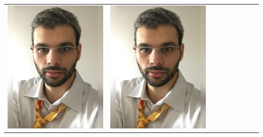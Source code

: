 \documentclass[landscape,a0paper,fontscale=0.292]{baposter}
\begin{document}
\begin{poster}
{\begin{center}
\begin{tabularx}{\linewidth}{X X X X X X X X X}

\includegraphics[width=\linewidth]{censi.jpg}&
\includegraphics[width=\linewidth]{censi.jpg}&

\end{tabularx}
\end{center}}
\end{poster}
\end{document}
